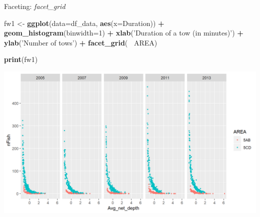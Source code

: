 \documentclass[
  ignorenonframetext,
]{beamer}
\newenvironment{Shaded}{\begin{snugshade}}{\end{snugshade}}
\newcommand{\DataTypeTok}[1]{\textcolor[rgb]{0.13,0.29,0.53}{#1}}
\newcommand{\DecValTok}[1]{\textcolor[rgb]{0.00,0.00,0.81}{#1}}
\newcommand{\KeywordTok}[1]{\textcolor[rgb]{0.13,0.29,0.53}{\textbf{#1}}}
\newcommand{\NormalTok}[1]{#1}
\newcommand{\OperatorTok}[1]{\textcolor[rgb]{0.81,0.36,0.00}{\textbf{#1}}}
\newcommand{\StringTok}[1]{\textcolor[rgb]{0.31,0.60,0.02}{#1}}
\begin{document}
\begin{frame}[fragile]{Faceting: \emph{facet\_grid}}
\protect\hypertarget{faceting-facet_grid-1}{}

\begin{Shaded}
\begin{Highlighting}[]
\NormalTok{fw1 <-}\StringTok{ }\KeywordTok{ggplot}\NormalTok{(}\DataTypeTok{data=}\NormalTok{df_data, }\KeywordTok{aes}\NormalTok{(}\DataTypeTok{x=}\NormalTok{Duration)) }\OperatorTok{+}
\StringTok{  }\KeywordTok{geom_histogram}\NormalTok{(}\DataTypeTok{binwidth=}\DecValTok{1}\NormalTok{) }\OperatorTok{+}\StringTok{ }
\StringTok{  }\KeywordTok{xlab}\NormalTok{(}\StringTok{'Duration of a tow (in minutes)'}\NormalTok{) }\OperatorTok{+}\StringTok{ }\KeywordTok{ylab}\NormalTok{(}\StringTok{'Number of tows'}\NormalTok{) }\OperatorTok{+}
\StringTok{  }\KeywordTok{facet_grid}\NormalTok{(}\OperatorTok{~}\StringTok{ }\NormalTok{AREA) }

\KeywordTok{print}\NormalTok{(fw1)}
\end{Highlighting}
\end{Shaded}

\begin{center}\includegraphics[width=0.8\linewidth]{figure/facet_grid_1-1} \end{center}

\end{frame}
\end{document}
